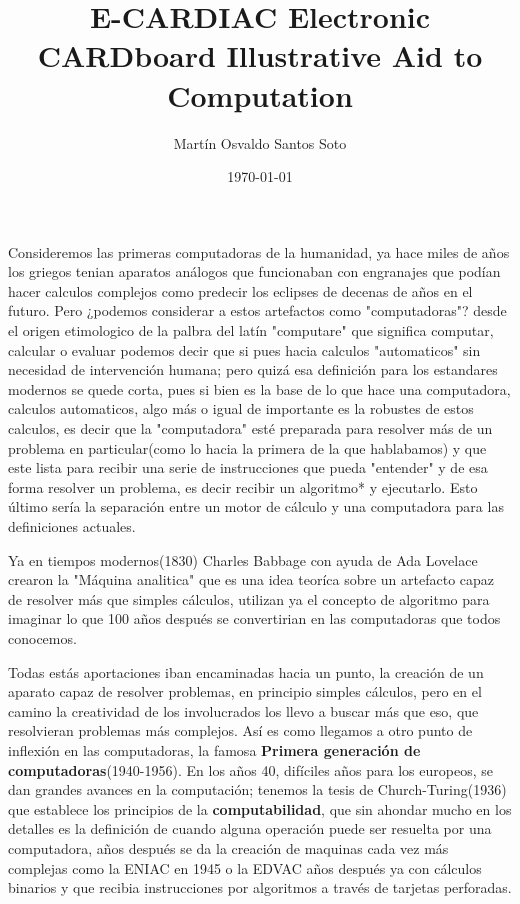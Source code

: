 \documentclass[12pt]{article}
\title{E-CARDIAC Electronic CARDboard Illustrative Aid to Computation}
\author{Martín Osvaldo Santos Soto}
\date{\today}
\begin{document}
	\maketitle
	
	Consideremos las primeras computadoras de la humanidad, ya hace miles de años los griegos tenian aparatos análogos que funcionaban con engranajes
	que podían hacer calculos complejos como predecir los eclipses de decenas de años en el futuro. Pero ¿podemos considerar a estos artefactos como "computadoras"?
	desde el origen etimologico de la palbra del latín "computare" que significa computar, calcular o evaluar podemos decir que si pues hacia calculos "automaticos"
	sin necesidad de intervención humana; pero quizá esa definición para los estandares modernos se quede corta, pues si bien es la base de lo que hace
	una computadora, calculos automaticos, algo más o igual de importante es la robustes de estos calculos, es decir que la "computadora" esté preparada
	para resolver más de un problema en particular(como lo hacia la primera de la que hablabamos) y que este lista para recibir una serie de instrucciones
	que pueda "entender" y de esa forma resolver un problema, es decir recibir un algoritmo* y ejecutarlo. Esto último sería la separación entre
	un motor de cálculo y una computadora para las definiciones actuales.
	
	Ya en tiempos modernos(1830) Charles Babbage con ayuda de Ada Lovelace crearon la "Máquina analitica" que es una idea teoríca sobre un artefacto capaz
	de resolver más que simples cálculos, utilizan ya el concepto de algoritmo para imaginar lo que 100 años después se convertirian en las computadoras que todos
	conocemos.
	
	Todas estás aportaciones iban encaminadas hacia un punto, la creación de un aparato capaz de resolver problemas, en principio simples cálculos, pero 
	en el camino la creatividad de los involucrados los llevo a buscar más que eso, que resolvieran problemas más complejos. Así es como llegamos
	a otro punto de inflexión en las computadoras, la famosa \textbf{Primera generación de computadoras}(1940-1956). En los años 40, difíciles años para los
	europeos, se dan grandes avances en la computación; tenemos la tesis de Church-Turing(1936) que establece los principios de la \textbf{computabilidad}, que
	sin ahondar mucho en los detalles es la definición de cuando alguna operación puede ser resuelta por una computadora, años después se da la creación
	de maquinas cada vez más complejas como la ENIAC en 1945 o la EDVAC años después ya con cálculos binarios y que recibia instrucciones por algoritmos
	a través de tarjetas perforadas.
	
\end{document}
